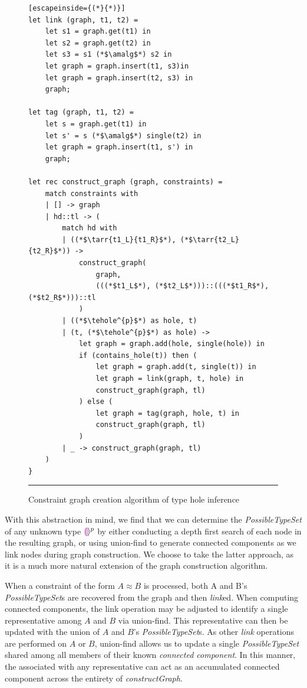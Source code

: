 \begin{figure}[htbp]
\begin{lstlisting}[escapeinside={(*}{*)}]
let link (graph, t1, t2) =
    let s1 = graph.get(t1) in
    let s2 = graph.get(t2) in
    let s3 = s1 (*$\amalg$*) s2 in
    let graph = graph.insert(t1, s3)in
    let graph = graph.insert(t2, s3) in
    graph;

let tag (graph, t1, t2) =
    let s = graph.get(t1) in
    let s' = s (*$\amalg$*) single(t2) in
    let graph = graph.insert(t1, s') in 
    graph;

let rec construct_graph (graph, constraints) =
    match constraints with
    | [] -> graph
    | hd::tl -> (
        match hd with
        | ((*$\tarr{t1_L}{t1_R}$*), (*$\tarr{t2_L}{t2_R}$*)) ->
            construct_graph(
                graph, 
                (((*$t1_L$*), (*$t2_L$*)))::(((*$t1_R$*), (*$t2_R$*)))::tl
            )
        | ((*$\tehole^{p}$*) as hole, t)
        | (t, (*$\tehole^{p}$*) as hole) ->
            let graph = graph.add(hole, single(hole)) in
            if (contains_hole(t)) then (
                let graph = graph.add(t, single(t)) in
                let graph = link(graph, t, hole) in
                construct_graph(graph, tl)
            ) else (
                let graph = tag(graph, hole, t) in
                construct_graph(graph, tl)
            )
        | _ -> construct_graph(graph, tl)
    )
}

\end{lstlisting}
\vspace{-4px}
 \hrule
\caption{Constraint graph creation algorithm of type hole inference}
\label{fig:algcode}
\end{figure}

With this abstraction in mind, we find that we can determine the \textit{PossibleTypeSet} of any unknown type $\textcolor{violet}{\llparenthesis}\textcolor{violet}{\rrparenthesis}^{p}$ by either conducting a depth first search of each node in the resulting graph, or using union-find to generate connected components as we link nodes during graph construction. We choose to take the latter approach, as it is a much more natural extension of the graph construction algorithm.

When a constraint of the form $A \approx B$ is processed, both A and B's \textit{PossibleTypeSet}s are recovered from the graph and then \textit{link}ed. When computing connected components, the link operation may be adjusted to identify a single representative among $A$ and $B$ via union-find. This representative can then be updated with the union of $A$ and $B$'s \textit{PossibleTypeSet}s. As other \textit{link} operations are performed on $A$ or $B$, union-find allows us to update a single \textit{PossibleTypeSet} shared among all members of their known \textit{connected component}. In this manner, the  associated with any representative can act as an accumulated connected component across the entirety of \textit{constructGraph}.

